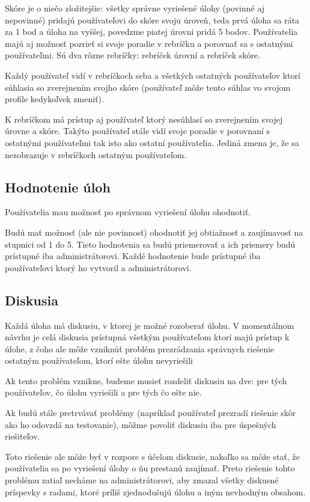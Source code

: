 Skóre je o niečo zložitejšie: všetky správne vyriešené úlohy (povinné aj nepovinné)
pridajú používateľovi do skóre svoju úroveň, teda prvá úloha sa ráta za
1 bod a úloha na vyššej, povedzme piatej úrovni pridá 5 bodov.
\newline
\newline
Používatelia majú aj možnosť pozrieť si svoje poradie v rebríčku a porovnať sa
s ostatnými používateľmi. Sú dva rôzne rebríčky: rebríček úrovní a rebríček skóre.

Každý používateľ vidí v rebríčkoch seba a všetkých ostatných používateľov ktorí
súhlasia so zverejnením svojho skóre (používateľ môže tento súhlas vo svojom profile kedykoľvek zmeniť).

K rebríčkom má prístup aj používateľ ktorý nesúhlasí so zverejnením svojej úrovne a skóre.
Takýto používateľ stále vidí svoje poradie v porovnaní s ostatnými používateľmi tak isto
ako ostatní používatelia. Jediná zmena je, že sa nezobrazuje v rebríčkoch ostatným používateľom.

\subsection{Hodnotenie úloh}
\label{rating}
Používatelia mau možnosť po správnom vyriešení úlohu ohodnotiť.

Budú mať možnosť (ale nie povinnosť) ohodnotiť jej obtiažnosť a
zaujímavosť na stupnici od 1 do 5. Tieto hodnotenia sa budú priemerovať a ich priemery
budú prístupné iba administrátorovi. Každé hodnotenie bude prístupné iba používateľovi ktorý
ho vytvoril a administrátorovi.

\subsection{Diskusia}
Každá úloha má diskusiu, v ktorej je možné rozoberať úlohu.
V momentálnom návrhu je celá diskusia prístupná všetkým používateľom ktorí majú
prístup k úlohe, z čoho ale môže vzniknúť problém prezrádzania správnych riešenie
ostatným používateľom, ktorí ešte úlohu nevyriešili

Ak tento problém vznikne, budeme musieť rozdeliť diskusiu na dve: pre tých používateľov, čo úlohu vyriešili a pre tých čo ešte nie.

Ak budú stále pretrvávať problémy (napríklad používateľ prezradí riešenie skôr ako ho odovzdá na testovanie),
môžme povoliť diskusiu iba pre úspešných riešiteľov.

Toto riešenie ale môže byť v rozpore s účelom diskusie, nakoľko sa môže stať, že používatelia sa po vyriešení úlohy
o ňu prestanú zaujímať. Preto riešenie tohto problému zatiaľ necháme na administrátorovi, aby zmazal všetky diskusné
príspevky s radami, ktoré príliš zjednodušujú úlohu a iným nevhodným obsahom.
